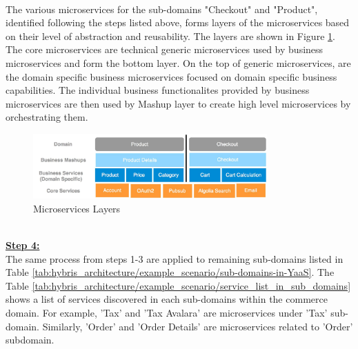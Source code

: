 \\
The various microservices for the sub-domains "Checkout" and "Product", identified following the steps listed above, forms layers of the microservices based on their level of abstraction and reusability. The layers are shown in Figure \ref{fig:hybris_architecture/interview/microservices-layers}. The core microservices are technical generic microservices used by business microservices and form the bottom layer. On the top of generic microservices, are the domain specific business microservices focused on domain specific business capabilities. The individual business functionalites provided by business microservices are then used by Mashup layer to create high level microservices by orchestrating them.
\\
\begin{figure}[H]
\begin{center}
\includegraphics[width=0.8\textwidth]{figures/hybris_architecture_four}
\caption{Microservices Layers}
\label{fig:hybris_architecture/interview/microservices-layers}
\end{center}
\end{figure}
\\
\textbf{\underline{Step 4:}}
\\
The same process from steps 1-3 are applied to remaining sub-domains listed in Table \ref{tab:hybris_architecture/example_scenario/sub-domains-in-YaaS}. The Table \ref{tab:hybris_architecture/example_scenario/service_list_in_sub_domains} shows a list of services discovered in each sub-domains within the commerce domain. For example, 'Tax' and 'Tax Avalara' are microservices under 'Tax' sub-domain. Similarly, 'Order' and 'Order Details' are microservices related to 'Order' subdomain.
